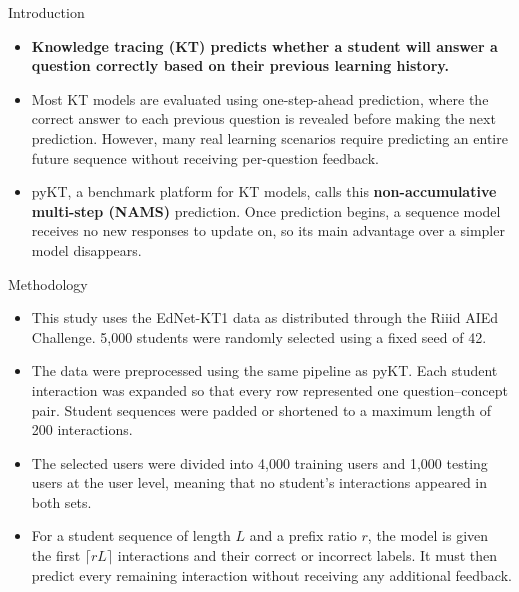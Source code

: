 \documentclass[final,xcolor={table}]{beamer}
\newlength{\colwidth}
\newenvironment{posterbullets}{%
  \begingroup
  \setlength{\leftmargini}{0.82cm}%
  \begin{itemize}
  \setlength{\topsep}{0pt}%
  \setlength{\partopsep}{0pt}%
  \setlength{\parsep}{0pt}%
  \setlength{\itemsep}{0.14ex}%
}{%
  \end{itemize}
  \endgroup
}
\begin{document}
\begin{frame}[t]
\begin{columns}[t]
\begin{column}{\colwidth}
\begin{block}{Introduction}
\begin{posterbullets}
  \item \textbf{Knowledge tracing (KT) predicts whether a student will
        answer a question correctly based on their previous learning
        history.}
  \item Most KT models are evaluated using one-step-ahead prediction, where
        the correct answer to each previous question is revealed before
        making the next prediction. However, many real learning scenarios
        require predicting an entire future sequence without receiving
        per-question feedback.
  \item pyKT, a benchmark platform for KT models, calls this
        \textbf{non-accumulative multi-step (NAMS)} prediction. Once
        prediction begins, a sequence model receives no new responses to
        update on, so its main advantage over a simpler model disappears.
\end{posterbullets}
\end{block}

\begin{block}{Methodology}
\begin{posterbullets}
  \item This study uses the EdNet-KT1 data as distributed through the Riiid
        AIEd Challenge. 5{,}000 students were randomly selected using a fixed
        seed of 42.
  \item The data were preprocessed using the same pipeline as pyKT. Each
        student interaction was expanded so that every row represented one
        question--concept pair. Student sequences were padded or shortened
        to a maximum length of 200 interactions.
  \item The selected users were divided into 4{,}000 training users and
        1{,}000 testing users at the user level, meaning that no student's
        interactions appeared in both sets.
  \item For a student sequence of length $L$ and a prefix ratio $r$, the
        model is given the first $\lceil rL\rceil$ interactions and their
        correct or incorrect labels. It must then predict every remaining
        interaction without receiving any additional feedback.
\end{posterbullets}


\end{block}
\end{column}
\end{columns}
\end{frame}
\end{document}
